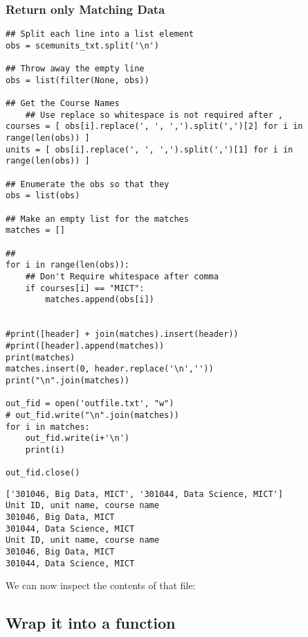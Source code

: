 \documentclass[11pt]{article}
\begin{document}
\subsubsection{Return only Matching Data}
\label{sec:org60dc81a}

\begin{verbatim}
## Split each line into a list element
obs = scemunits_txt.split('\n')

## Throw away the empty line
obs = list(filter(None, obs))

## Get the Course Names
    ## Use replace so whitespace is not required after ,
courses = [ obs[i].replace(', ', ',').split(',')[2] for i in range(len(obs)) ]
units = [ obs[i].replace(', ', ',').split(',')[1] for i in range(len(obs)) ]

## Enumerate the obs so that they
obs = list(obs)

## Make an empty list for the matches
matches = []

##
for i in range(len(obs)):
    ## Don't Require whitespace after comma
    if courses[i] == "MICT":
        matches.append(obs[i])


#print([header] + join(matches).insert(header))
#print([header].append(matches))
print(matches)
matches.insert(0, header.replace('\n',''))
print("\n".join(matches))

out_fid = open('outfile.txt', "w")
# out_fid.write("\n".join(matches))
for i in matches:
    out_fid.write(i+'\n')
    print(i)

out_fid.close()
\end{verbatim}

\begin{verbatim}
['301046, Big Data, MICT', '301044, Data Science, MICT']
Unit ID, unit name, course name
301046, Big Data, MICT
301044, Data Science, MICT
Unit ID, unit name, course name
301046, Big Data, MICT
301044, Data Science, MICT
\end{verbatim}


We can now inspect the contents of that file:

\subsection{Wrap it into a function}
\label{sec:org869de63}
\end{document}
